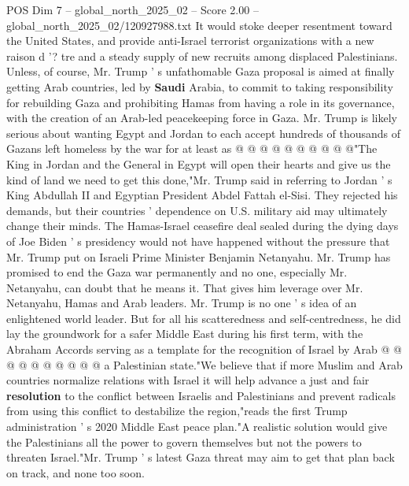 \begin{textsample}{POS Dim 7 – global\_north\_2025\_02 – Score 2.00 – global\_north\_2025\_02/120927988.txt}
It would stoke deeper resentment toward the United States, and provide anti-Israel terrorist organizations with a new raison d '? tre and a steady supply of new recruits among displaced Palestinians.
Unless, of course, Mr.
Trump ' s unfathomable Gaza proposal is aimed at finally getting Arab countries, led by \textbf{Saudi} Arabia, to commit to taking responsibility for rebuilding Gaza and prohibiting Hamas from having a role in its governance, with the creation of an Arab-led peacekeeping force in Gaza.
Mr.
Trump is likely serious about wanting Egypt and Jordan to each accept hundreds of thousands of Gazans left homeless by the war for at least as @ @ @ @ @ @ @ @ @ @"The King in Jordan and the General in Egypt will open their hearts and give us the kind of land we need to get this done,"Mr.
Trump said in referring to Jordan ' s King Abdullah II and Egyptian President Abdel Fattah el-Sisi.
They rejected his demands, but their countries ' dependence on U.S. military aid may ultimately change their minds.
The Hamas-Israel ceasefire deal sealed during the dying days of Joe Biden ' s presidency would not have happened without the pressure that Mr.
Trump put on Israeli Prime Minister Benjamin Netanyahu.
Mr.
Trump has promised to end the Gaza war permanently and no one, especially Mr.
Netanyahu, can doubt that he means it.
That gives him leverage over Mr.
Netanyahu, Hamas and Arab leaders.
Mr.
Trump is no one ' s idea of an enlightened world leader.
But for all his scatteredness and self-centredness, he did lay the groundwork for a safer Middle East during his first term, with the Abraham Accords serving as a template for the recognition of Israel by Arab @ @ @ @ @ @ @ @ @ @ a Palestinian state."We believe that if more Muslim and Arab countries normalize relations with Israel it will help advance a just and fair \textbf{resolution} to the conflict between Israelis and Palestinians and prevent radicals from using this conflict to destabilize the region,"reads the first Trump administration ' s 2020 Middle East peace plan."A realistic solution would give the Palestinians all the power to govern themselves but not the powers to threaten Israel."Mr.
Trump ' s latest Gaza threat may aim to get that plan back on track, and none too soon.

\end{textsample}
